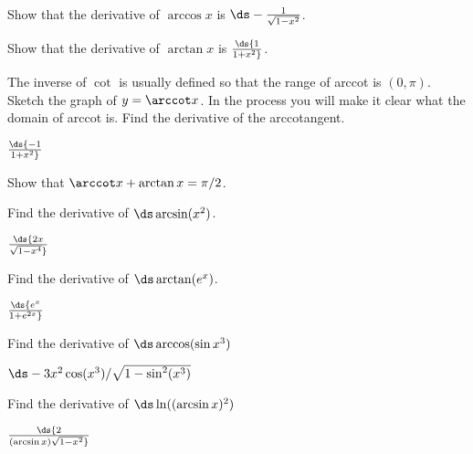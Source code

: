 \begin{exercises}

\begin{exercise} Show that the derivative of $\arccos x$ is $\ds -{1\over
  \sqrt{1-x^2}}$. 
\end{exercise}

\begin{exercise} Show that the derivative of 
$\arctan x$ is $\ds {1\over 1+x^2}$. 
\end{exercise}

\begin{exercise} The inverse of $\cot$ is usually defined so that the
 range of arccot is $(0, \pi )$.  Sketch the graph of $y=\arccot
 x$. In the process you will make it clear what the domain of arccot
 is. Find the derivative of the arccotangent.
\begin{answer} $\ds {-1\over 1+x^2}$
\end{answer}\end{exercise}

\begin{exercise} Show that $\arccot x + \arctan x =\pi/2$.
\end{exercise}

\begin{exercise} Find the derivative of $\ds \arcsin(x^2)$.
\begin{answer} $\ds {2x\over\sqrt{1-x^4}}$
\end{answer}\end{exercise}

\begin{exercise} Find the derivative of $\ds \arctan(e^x)$.
\begin{answer} $\ds {e^x\over1+e^{2x}}$
\end{answer}\end{exercise}

\begin{exercise} Find the derivative of $\ds \arccos (\sin x^3 )$
\begin{answer} $\ds -3x^2\cos(x^3)/\sqrt{1-\sin^2(x^3)}$
\end{answer}\end{exercise}

\begin{exercise} Find the derivative of $\ds \ln( (\arcsin x )^2)$
\begin{answer} $\ds {2\over(\arcsin x)\sqrt{1-x^2}}$
\end{answer}\end{exercise}


\end{exercises}
